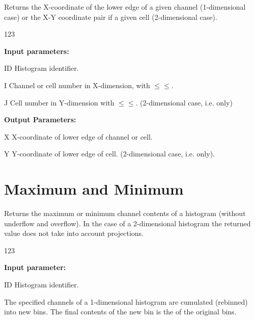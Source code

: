  
\Action
Returns the X-coordinate of the lower edge of a given channel
(1-dimensional case) or the X-Y coordinate pair if a given cell
(2-dimensional case).
 
\begin{DLtt}{123}
\item[{\rm\bf Input parameters:}]
\item[ID] Histogram identifier.
\item[I] Channel or cell number in X-dimension, with
\(\leq\)\(\leq\).
\item[J] Cell number in Y-dimension with \(\leq\)\(\leq\).
(2-dimensional case, i.e.  only)
\item[{\rm\bf Output Parameters:}]
\item[X] X-coordinate of lower edge of channel or cell.
\item[Y] Y-coordinate of lower edge of cell.
(2-dimensional case, i.e.  only).
\end{DLtt}
\newpage
 
\section{Maximum and Minimum}
\label{HMAXIMIN}
 
 
\Action
Returns the maximum or minimum channel contents of a histogram
(without underflow and overflow).
In the case of a 2-dimensional histogram the returned
value does not take into account projections.
 
\begin{DLtt}{123}
\item[{\rm\bf Input parameter:}]
\item[ID] Histogram identifier.
\end{DLtt}
 

\label{HREBINNI}
 
 
\Action
The specified channels of a 1-dimensional histogram are
cumulated (rebinned) into new bins.
The final contents of the new bin is the  
of the original bins.
 
